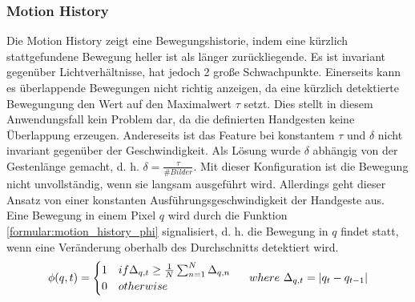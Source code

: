 \subsubsection{Motion History}
Die Motion History zeigt eine Bewegungshistorie, indem eine kürzlich stattgefundene Bewegung heller ist als länger zurückliegende. Es ist invariant gegenüber Lichtverhältnisse, hat jedoch 2 große Schwachpunkte.
Einerseits kann es überlappende Bewegungen nicht richtig anzeigen, da eine kürzlich detektierte Bewegungung den Wert auf den Maximalwert $\tau$ setzt. Dies stellt in diesem Anwendungsfall kein
Problem dar, da die definierten Handgesten keine Überlappung erzeugen.
\newline
\newline
Andereseits ist das Feature bei konstantem $\tau$ und $\delta$ nicht invariant gegenüber der Geschwindigkeit. Als Lösung wurde $\delta$ abhängig von der Gestenlänge gemacht,
d. h. $\delta = \frac{\tau}{\#Bilder}$. Mit dieser Konfiguration ist die Bewegung nicht unvollständig, wenn sie langsam ausgeführt wird. Allerdings geht dieser Ansatz von einer konstanten
Ausführungsgeschwindigkeit der Handgeste aus.
\newline
\newline
Eine Bewegung in einem Pixel $q$ wird durch die Funktion \ref{formular:motion_history_phi} signalisiert, d. h. die Bewegung in $q$ findet statt, wenn eine Veränderung oberhalb des Durchschnitts detektiert wird.
\begin{align}
    \phi(q,t) = \begin{cases}
                    1 & if \Delta_{q,t} \geq \frac{1}{N} \sum_{n=1}^N \Delta_{q,n} \\
                    0 & otherwise
    \end{cases}
    \hspace{0.5cm}where\ \Delta_{q,t} = |q_t - q_{t-1}|
    \label{formular:motion_history_phi}
\end{align}

